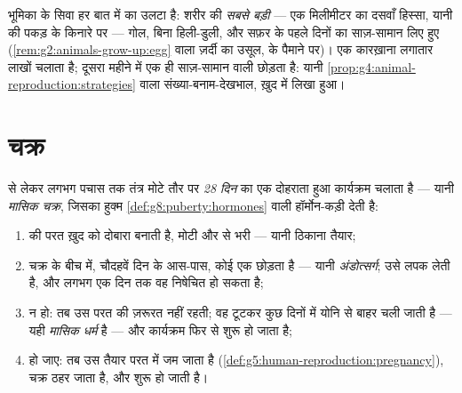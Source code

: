 \begin{example}[अंडाणु, पास से]\label{ex:g8:reproductive-systems:egg}
 भूमिका के सिवा हर बात में  का उलटा है: शरीर की
\emph{सबसे बड़ी}  --- एक मिलीमीटर का दसवाँ हिस्सा, यानी  की
पकड़ के किनारे पर --- गोल, बिना हिली-डुली, और सफ़र के पहले दिनों का
साज़-सामान लिए हुए (\cref{rem:g2:animals-grow-up:egg} वाला ज़र्दी का
उसूल,  के पैमाने पर)। एक कारख़ाना लगातार लाखों चलाता है; दूसरा
महीने में एक ही साज़-सामान वाली  छोड़ता है: यानी
\cref{prop:g4:animal-reproduction:strategies} वाला
संख्या-बनाम-देखभाल, ख़ुद  में लिखा हुआ।
\end{example}

\section{चक्र}

\begin{proposition}[मासिक चक्र]\label{prop:g8:reproductive-systems:cycle}
 से लेकर लगभग पचास तक  तंत्र मोटे तौर पर \emph{28 दिन} का
एक दोहराता हुआ कार्यक्रम चलाता है --- यानी \emph{मासिक
चक्र}, जिसका हुक्म \cref{def:g8:puberty:hormones}
वाली हॉर्मोन-कड़ी देती है:
\begin{enumerate}
  \item {} की परत ख़ुद को दोबारा बनाती है, मोटी और  से भरी
        --- यानी ठिकाना तैयार;
  \item चक्र के बीच में, चौदहवें दिन के आस-पास, कोई  एक 
        छोड़ता है --- यानी \emph{अंडोत्सर्ग};
         उसे लपक लेती है, और लगभग एक दिन तक वह निषेचित हो
        सकता है;
  \item {} न हो: तब उस परत की ज़रूरत नहीं रहती; वह टूटकर कुछ दिनों
        में योनि से बाहर चली जाती है --- यही \emph{मासिक
        धर्म} है --- और कार्यक्रम फिर से शुरू हो
        जाता है;
  \item {} हो जाए: तब  उस तैयार परत में जम जाता है
        (\cref{def:g5:human-reproduction:pregnancy}), चक्र ठहर जाता
        है, और  शुरू हो जाती है।
\end{enumerate}
\end{proposition}
\admitted

